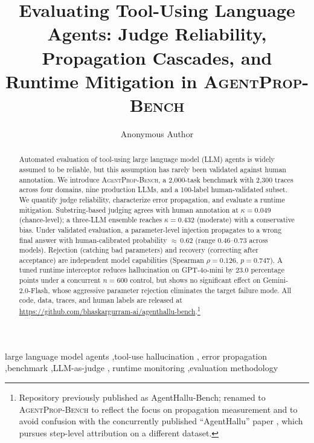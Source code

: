\documentclass[preprint,review,12pt,3p]{elsarticle}
\newcommand{\bench}{\textsc{AgentProp-Bench}\xspace}
\begin{document}
\linenumbers

\begin{frontmatter}

\title{Evaluating Tool-Using Language Agents: Judge Reliability,
Propagation Cascades, and Runtime Mitigation in \bench{}}

\author[anon]{Anonymous Author}

\begin{abstract}
Automated evaluation of tool-using large language model (LLM) agents is
widely assumed to be reliable, but this assumption has rarely been
validated against human annotation.
We introduce \bench{}, a 2{,}000-task benchmark with 2{,}300 traces
across four domains, nine production LLMs, and a 100-label
human-validated subset.
We quantify judge reliability, characterize error propagation, and
evaluate a runtime mitigation.
Substring-based judging agrees with human annotation at $\kappa{=}0.049$
(chance-level); a three-LLM ensemble reaches $\kappa{=}0.432$ (moderate)
with a conservative bias.
Under validated evaluation, a parameter-level injection propagates to a
wrong final answer with human-calibrated probability ${\approx}\,0.62$
(range 0.46--0.73 across models).
Rejection (catching bad parameters) and recovery (correcting after
acceptance) are independent model capabilities
(Spearman $\rho{=}0.126$, $p{=}0.747$).
A tuned runtime interceptor reduces hallucination on GPT-4o-mini by
23.0 percentage points under a concurrent $n{=}600$ control, but shows
no significant effect on Gemini-2.0-Flash, whose aggressive parameter
rejection eliminates the target failure mode.
All code, data, traces, and human labels are released at
\url{https://github.com/bhaskargurram-ai/agenthallu-bench}.\footnote{Repository
previously published as AgentHallu-Bench; renamed to \bench{} to
reflect the focus on propagation measurement and to avoid confusion
with the concurrently published ``AgentHallu'' paper
\citep{liu2026agenthallu}, which pursues step-level attribution on a
different dataset.}
\end{abstract}

\begin{keyword}
large language model agents \sep tool-use hallucination \sep
error propagation \sep benchmark \sep LLM-as-judge \sep
runtime monitoring \sep evaluation methodology
\end{keyword}

\end{frontmatter}
\end{document}
